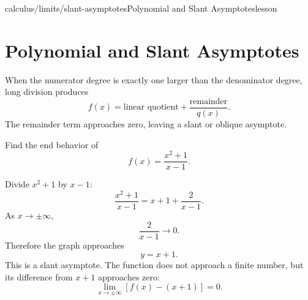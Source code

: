 \begin{webpage}{calculus/limits/slant-asymptotes}{Polynomial and Slant Asymptotes}{lesson}
\section{Polynomial and Slant Asymptotes}


When the numerator degree is exactly one larger than the denominator degree, long division produces
\[
  f(x)=\text{linear quotient}+\frac{\text{remainder}}{q(x)}.
\]
The remainder term approaches zero, leaving a slant or oblique asymptote.

\begin{bgexample}[title={Slant asymptote by division}]
Find the end behavior of
\[
  f(x)=\frac{x^2+1}{x-1}.
\]

\begin{bgsolution}
Divide \(x^2+1\) by \(x-1\):
\[
  \frac{x^2+1}{x-1}=x+1+\frac2{x-1}.
\]
As \(x\to\pm\infty\),
\[
  \frac2{x-1}\to0.
\]
Therefore the graph approaches
\[
  \boxed{y=x+1}.
\]
This is a slant asymptote. The function does not approach a finite number, but its difference from \(x+1\) approaches zero:
\[
  \lim_{x\to\pm\infty}[f(x)-(x+1)]=0.
\]
\end{bgsolution}
\end{bgexample}
\end{webpage}

